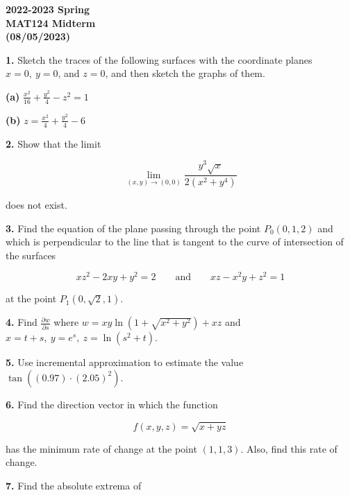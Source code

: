 \documentclass{article}
\begin{document}
\pagestyle{empty}
\large

\begin{center}
\textbf{2022-2023 Spring \\MAT124 Midterm\\(08/05/2023)}
\end{center}

\textbf{1.} Sketch the traces of the following surfaces with the coordinate planes $x=0,\:y=0$, and $z=0$, and then sketch the graphs of them.

\textbf{(a)} $\displaystyle\frac{x^2}{16}+\frac{y^2}4-z^2=1$

\textbf{(b)} $\displaystyle z=\frac{x^2}4+\frac{y^2}4-6$

\vspace{1em}

\textbf{2.} Show that the limit

\[\lim_{(x,y)\to(0,0)}\frac{y^3\sqrt x}{2\left(x^2+y^4\right)}\]

does not exist.

\vspace{1em}

\textbf{3.} Find the equation of the plane passing through the point $P_0(0,1,2)$ and which is perpendicular to the line that is tangent to the curve of intersection of the surfaces

\[xz^2-2xy+y^2=2\qquad\text{and}\qquad xz-x^2y+z^2=1\]

at the point $P_1\left(0,\sqrt2, 1\right)$.

\vspace{1em}

\textbf{4.} Find $\displaystyle\frac{\partial w}{\partial s}$ where $w=xy\ln\left(1+\sqrt{x^2+y^2}\right)+xz$ and $x=t+s,\:y={e}^s,\:z=\ln\left(s^2+t\right)$.

\vspace{1em}

\textbf{5.} Use incremental approximation to estimate the value $\tan\left((0.97)\cdot(2.05)^2\right)$.

\vspace{1em}

\textbf{6.} Find the direction vector in which the function

\[f(x,y,z)=\sqrt{x+yz}\]

has the minimum rate of change at the point $(1,1,3)$. Also, find this rate of change.

\vspace{1em}

\textbf{7.} Find the absolute extrema of
\end{document}
